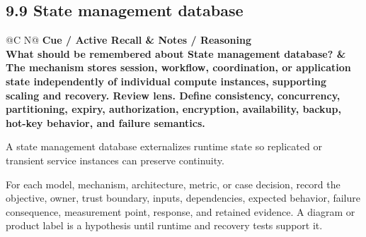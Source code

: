 \documentclass[11pt]{article}
\newcommand{\CornellHeader}{\rowcolor{Navy}\color{white}\bfseries Cue / Active Recall & \color{white}\bfseries Notes / Reasoning \\\endhead}
\newcommand{\CornellRow}[2]{\cellcolor{CueGray}\textbf{#1} & #2 \\\addlinespace[3pt]}
\begin{document}
\subsection{9.9 State management database}
\begin{longtable}{@{}C N@{}}
\CornellHeader
\CornellRow{What should be remembered about State management database?}{The mechanism stores session, workflow, coordination, or application state independently of individual compute instances, supporting scaling and recovery. \textbf{Review lens.} Define consistency, concurrency, partitioning, expiry, authorization, encryption, availability, backup, hot-key behavior, and failure semantics.}
\end{longtable}
\begin{sectionsummarybox}
A state management database externalizes runtime state so replicated or transient service instances can preserve continuity.
\end{sectionsummarybox}
\begin{practicebox}
For each model, mechanism, architecture, metric, or case decision, record the objective, owner, trust boundary, inputs, dependencies, expected behavior, failure consequence, measurement point, response, and retained evidence. A diagram or product label is a hypothesis until runtime and recovery tests support it.
\end{practicebox}
\end{document}
